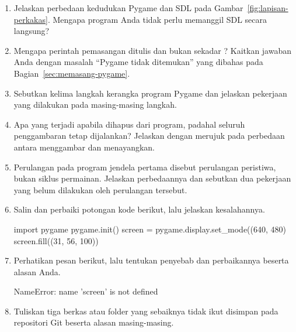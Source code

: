 
\begin{enumerate}
  \item Jelaskan perbedaan kedudukan Pygame dan SDL pada
        Gambar~\ref{fig:lapisan-perkakas}. Mengapa program Anda tidak perlu
        memanggil SDL secara langsung?

  \item Mengapa perintah pemasangan ditulis 
        dan bukan sekadar ? Kaitkan jawaban Anda
        dengan masalah ``Pygame tidak ditemukan'' yang dibahas pada
        Bagian~\ref{sec:memasang-pygame}.

  \item Sebutkan kelima langkah kerangka program Pygame dan jelaskan pekerjaan
        yang dilakukan pada masing-masing langkah.

  \item Apa yang terjadi apabila  dihapus dari
        program, padahal seluruh penggambaran tetap dijalankan? Jelaskan
        dengan merujuk pada perbedaan antara menggambar dan menayangkan.

  \item Perulangan pada program jendela pertama disebut perulangan peristiwa,
        bukan siklus permainan. Jelaskan perbedaannya dan sebutkan dua
        pekerjaan yang belum dilakukan oleh perulangan tersebut.

  \item Salin dan perbaiki potongan kode berikut, lalu jelaskan kesalahannya.
\begin{kodekeluaran}
import pygame
pygame.init()
screen = pygame.display.set_mode((640, 480)
screen.fill((31, 56, 100))
\end{kodekeluaran}

  \item Perhatikan pesan berikut, lalu tentukan penyebab dan perbaikannya
        beserta alasan Anda.
\begin{kodekeluaran}
NameError: name 'screen' is not defined
\end{kodekeluaran}

  \item Tuliskan tiga berkas atau folder yang sebaiknya tidak ikut disimpan
        pada repositori Git beserta alasan masing-masing.
\end{enumerate}

